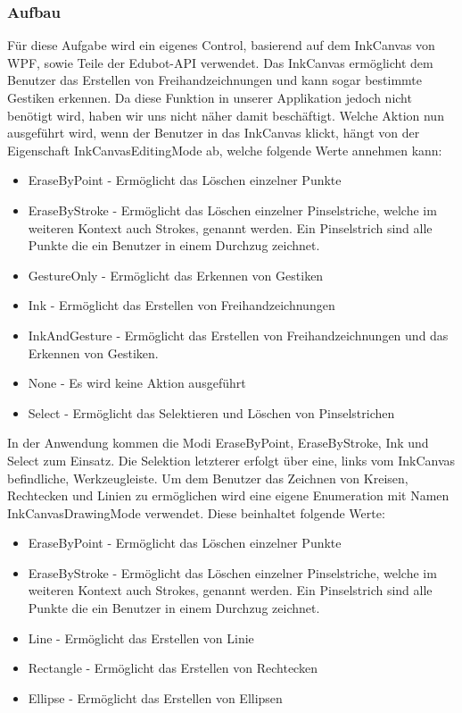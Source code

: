 \subsubsection{Aufbau}
Für diese Aufgabe wird ein eigenes Control, basierend auf dem InkCanvas von WPF, sowie Teile der Edubot-API verwendet. Das InkCanvas ermöglicht dem Benutzer das Erstellen von Freihandzeichnungen und kann sogar bestimmte Gestiken erkennen. Da diese Funktion in unserer Applikation jedoch nicht benötigt wird, haben wir uns nicht näher damit beschäftigt. Welche Aktion nun ausgeführt wird, wenn der Benutzer in das InkCanvas klickt, hängt von der Eigenschaft InkCanvasEditingMode ab, welche folgende Werte annehmen kann:
\begin{itemize}
\item EraseByPoint - Ermöglicht das Löschen einzelner Punkte
\item EraseByStroke - Ermöglicht das Löschen einzelner Pinselstriche, welche im weiteren Kontext auch Strokes, genannt werden. Ein Pinselstrich sind alle Punkte die ein Benutzer in einem Durchzug zeichnet.
\item GestureOnly - Ermöglicht das Erkennen von Gestiken
\item Ink - Ermöglicht das Erstellen von Freihandzeichnungen
\item InkAndGesture - Ermöglicht das Erstellen von Freihandzeichnungen und das Erkennen von Gestiken.
\item None - Es wird keine Aktion ausgeführt
\item Select - Ermöglicht das Selektieren und Löschen von Pinselstrichen
\end{itemize}
In der Anwendung kommen die Modi EraseByPoint, EraseByStroke, Ink und Select zum Einsatz. Die Selektion letzterer erfolgt über eine, links vom InkCanvas befindliche, Werkzeugleiste. Um dem Benutzer das Zeichnen von Kreisen, Rechtecken und Linien zu ermöglichen wird eine eigene Enumeration mit Namen InkCanvasDrawingMode verwendet. Diese beinhaltet folgende Werte:
\begin{itemize}
\item EraseByPoint - Ermöglicht das Löschen einzelner Punkte
\item EraseByStroke - Ermöglicht das Löschen einzelner Pinselstriche, welche im weiteren Kontext auch Strokes, genannt werden. Ein Pinselstrich sind alle Punkte die ein Benutzer in einem Durchzug zeichnet.
\item Line - Ermöglicht das Erstellen von Linie
\item Rectangle - Ermöglicht das Erstellen von Rechtecken
\item Ellipse - Ermöglicht das Erstellen von Ellipsen
\end{itemize}

